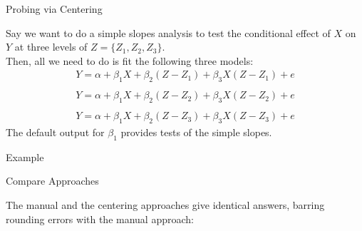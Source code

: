 \documentclass{beamer}
\newcommand{\va}[0]{\vspace{12pt}}
\begin{document}
\begin{frame}{Probing via Centering}
  
  Say we want to do a simple slopes analysis to test the conditional
  effect of $X$ on $Y$ at three levels of $Z = \{Z_1, Z_2,
  Z_3\}$.\\ 
  \va 
  Then, all we need to do is fit the following three
  models:
  \begin{align*}
    Y = \alpha + \beta_1X + \beta_2(Z - Z_1) + \beta_3 X(Z - Z_1) + e\\
    \\
    Y = \alpha + \beta_1X + \beta_2(Z - Z_2) + \beta_3 X(Z - Z_2) + e\\
    \\
    Y = \alpha + \beta_1X + \beta_2(Z - Z_3) + \beta_3 X(Z - Z_3) + e
  \end{align*}
  The default output for $\beta_1$ provides tests of the simple
  slopes.
  
\end{frame}



\begin{frame}[allowframebreaks]{Example}



\end{frame}


\begin{frame}{Compare Approaches}
  
  The manual and the centering approaches give identical answers,
  barring rounding errors with the manual approach: 
  \va


\end{frame}
\end{document}
